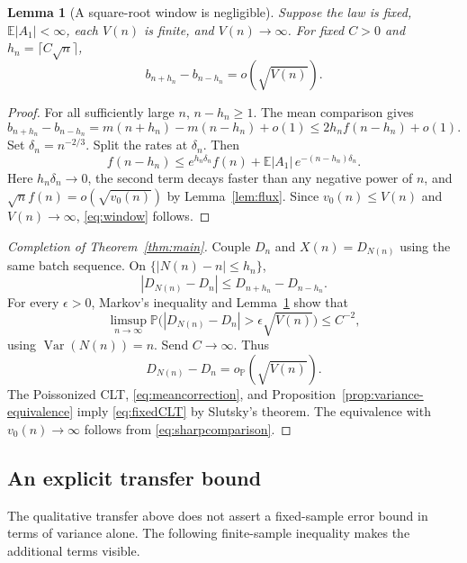 \documentclass[11pt]{article}
\numberwithin{equation}{section}
\newtheorem{lemma}[theorem]{Lemma}
\theoremstyle{definition}
\theoremstyle{remark}
\newcommand{\E}{\mathbb E}
\newcommand{\Pp}{\mathbb P}
\newcommand{\Var}{\operatorname{Var}}
\begin{document}
\begin{lemma}[A square-root window is negligible]\label{lem:window}
Suppose the law is fixed, $\E|A_1|<\infty$, each $V(n)$ is finite, and
$V(n)\to\infty$. For fixed $C>0$ and
$h_n=\lceil C\sqrt n\rceil$,
\begin{equation}\label{eq:window}
 b_{n+h_n}-b_{n-h_n}=o(\sqrt{V(n)}).
\end{equation}
\end{lemma}
\begin{proof}
For all sufficiently large $n$, $n-h_n\ge1$. The mean comparison gives
\[
 b_{n+h_n}-b_{n-h_n}
 =m(n+h_n)-m(n-h_n)+o(1)\le2h_nf(n-h_n)+o(1).
\]
Set $\delta_n=n^{-2/3}$. Split the rates at $\delta_n$. Then
\[
 f(n-h_n)\le e^{h_n\delta_n}f(n)
       +\E|A_1|\, e^{-(n-h_n)\delta_n}.
\]
Here $h_n\delta_n\to0$, the second term decays faster than any negative
power of $n$, and $\sqrt n f(n)=o(\sqrt{v_0(n)})$ by
Lemma~\ref{lem:flux}. Since $v_0(n)\le V(n)$ and $V(n)\to\infty$,
\eqref{eq:window} follows.
\end{proof}

\begin{proof}[Completion of Theorem~\ref{thm:main}]
Couple $D_n$ and $X(n)=D_{N(n)}$ using the same batch sequence. On
$\{|N(n)-n|\le h_n\}$,
\[
 |D_{N(n)}-D_n|\le D_{n+h_n}-D_{n-h_n}.
\]
For every $\epsilon>0$, Markov's inequality and
Lemma~\ref{lem:window} show that
\[
 \limsup_{n\to\infty}
 \Pp\bigl(|D_{N(n)}-D_n|>\epsilon\sqrt{V(n)}\bigr)\le C^{-2},
\]
using $\Var(N(n))=n$. Send $C\to\infty$. Thus
\begin{equation}\label{eq:coupling-negligible}
 D_{N(n)}-D_n=o_{\Pp}(\sqrt{V(n)}).
\end{equation}
The Poissonized CLT, \eqref{eq:meancorrection}, and
Proposition~\ref{prop:variance-equivalence} imply \eqref{eq:fixedCLT} by
Slutsky's theorem. The equivalence with $v_0(n)\to\infty$ follows from
\eqref{eq:sharpcomparison}.
\end{proof}

\subsection{An explicit transfer bound}
The qualitative transfer above does not assert a fixed-sample error bound
in terms of variance alone. The following finite-sample inequality makes the
additional terms visible.
\end{document}
